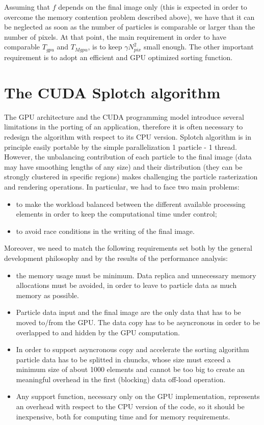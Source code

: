 \documentclass[11pt]{article}
\begin{document}
Assuming that $f$ depends on the final image only (this is expected in order 
to overcome the memory contention problem described above), we have that 
it can be neglected as soon as the number of particles is comparable or larger 
than the number of pixels. At that point, the main requirement in order 
to have comparable $T_{gpu}$ and $T_{Mgpu}$, is to keep $\gamma N_{pix}^2$
small enough. The other important requirement is to adopt an efficient 
and GPU optimized sorting function. 

\section{The CUDA Splotch algorithm}

The GPU architecture and the CUDA programming model introduce several limitations in the porting of an application, therefore it is often necessary to redesign the algorithm with respect to its CPU version. Splotch algorithm is in principle easily portable by the simple parallelization 1 particle - 1 thread. However, the unbalancing contribution of each particle to the final image (data may have smoothing lengths of any size) and their distribution (they can be strongly clustered in specific regions) makes challenging the particle rasterization and rendering operations. In particular, we had to face two main problems:
\begin{itemize}
\item 
to make the workload balanced between the different available processing elements in order to
keep the computational time under control;   
\item
to avoid race conditions in the writing of the final image. 
\end{itemize}
Moreover, we need to match the following requirements set both by the general development philosophy and by the 
results of the performance analysis:
\begin{itemize}
\item
the memory usage must be minimum. Data replica and unnecessary 
memory allocations must be avoided, in order to leave to particle
data as much memory as possible. 
\item
Particle data input and the final image are the only data that has to 
be moved to/from the GPU. The data copy has to be asyncronous in order
to be overlapped to and hidden by the GPU computation.
\item
In order to support asyncronous copy and accelerate the sorting algorithm
particle data has to be splitted in chuncks, whose size must exceed 
a minimum size of about 1000 elements and cannot be too big to create an
meaningful overhead in the first (blocking) data off-load operation.
\item
Any support function, necessary only on the GPU implementation, represents an overhead
with respect to the CPU version of the code, so it should be inexpensive,
both for computing time and for memory requirements. 
\end{itemize}
\end{document}

